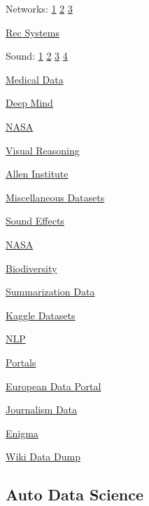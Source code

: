 \documentclass[]{book}
\begin{document}
Networks: \href{https://snap.stanford.edu/data/index.html}{1} \textbar{}
\href{http://networkrepository.com/index.php}{2} \textbar{}
\href{https://aminer.org/data-sna}{3}

\href{http://www.lab41.org/nine-datasets-for-investigating-recommender-systems/}{Rec
Systems}

Sound: \href{http://labrosa.ee.columbia.edu/millionsong/}{1} \textbar{}
\href{https://github.com/mdeff/fma}{2} \textbar{}
\href{http://homes.cs.washington.edu/~thickstn/musicnet.html}{3}
\textbar{} \href{https://datasets.freesound.org/fsd/}{4}

\href{https://github.com/beamandrew/medical-data}{Medical Data}

\href{https://deepmind.com/research/open-source/open-source-datasets/}{Deep
Mind}

\href{https://bmtgoncalves.github.io/pyNASA/}{NASA}

\href{http://lic.nlp.cornell.edu/nlvr/}{Visual Reasoning}

\href{http://allenai.org/data.html}{Allen Institute}

\href{http://users.stat.ufl.edu/~winner/datasets.html}{Miscellaneous
Datasets}

\href{http://bbcsfx.acropolis.org.uk/}{Sound Effects}

\href{https://open.nasa.gov/blog/}{NASA}

\href{https://www.gbif.org}{Biodiversity}

\href{https://summari.es}{Summarization Data}

\href{https://www.kaggle.com/datasets}{Kaggle Datasets}

\href{https://github.com/niderhoff/nlp-datasets/blob/master/README.md}{NLP}

\href{https://www.opendatasoft.com/a-comprehensive-list-of-all-open-data-portals-around-the-world/}{Portals}

\href{http://www.europeandataportal.eu/}{European Data Portal}

\href{http://cjlab.stanford.edu/2015/09/30/lab-launch-and-data-sets/}{Journalism
Data}

\href{https://public.enigma.com/}{Enigma}

\href{http://dumps.wikimedia.org/other/pagecounts-raw/}{Wiki Data Dump}

\subsection{Auto Data Science}\label{auto-data-science}
\end{document}
